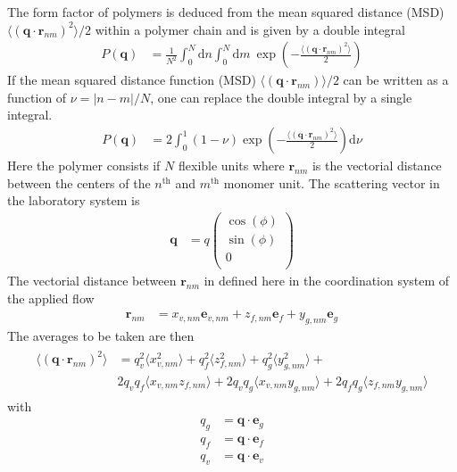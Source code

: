 The form factor of polymers is deduced from the mean squared distance (MSD) $\langle(\mathbf{q}\cdot\mathbf{r}_{nm})^2\rangle/2$ within a polymer chain and is given by a double integral
\begin{align}
  P(\mathbf{q}) & = \frac{1}{N^2}\int_0^N\mathrm{d}n\int_0^N\mathrm{d}m\: \exp\left(-\frac{\langle(\mathbf{q}\cdot\mathbf{r}_{nm})^2\rangle}{2}\right)
\end{align}
If the mean squared distance function (MSD) $\langle(\mathbf{q}\cdot\mathbf{r}_{nm})\rangle/2$ can be written as a function of $\nu=\left|n-m\right|/N$, one can replace the double integral by a single integral.
\begin{align} \label{eq:IQ_MSD}
 P(\mathbf{q}) & = 2\int_0^1 (1-\nu) \exp\left(-\frac{\langle(\mathbf{q}\cdot\mathbf{r}_{nm})^2\rangle}{2}\right) \mathrm{d}\nu
\end{align}
Here the polymer consists if $N$ flexible units where $\mathbf{r}_{nm}$ is the vectorial distance between the centers of the $n^\mathrm{th}$ and $m^\mathrm{th}$ monomer unit.
The scattering vector in the laboratory system is
\begin{align}
\mathbf{q} &= q
\left(
    \begin{array}{c}
        \cos(\phi) \\
        \sin(\phi) \\
        0 \\
    \end{array}
\right)
\end{align}
The vectorial distance between  $\mathbf{r}_{nm}$ in defined here in the coordination system of the applied flow
\begin{align}
\mathbf{r}_{nm} &= x_{v,nm} \mathbf{e}_{v,nm} + z_{f,nm} \mathbf{e}_{f} + y_{g,nm} \mathbf{e}_{g}
\end{align}
The averages to be taken are then
\begin{align}
\begin{split} \label{MSDfull}
 \langle(\mathbf{q}\cdot\mathbf{r}_{nm})^2\rangle  & = q_v^2 \langle x_{v,nm}^2\rangle + q_f^2 \langle z_{f,nm}^2\rangle + q_g^2 \langle y_{g,nm}^2\rangle + \\
 & 2q_v q_f \langle x_{v,nm} z_{f,nm}\rangle + 2q_v q_g \langle x_{v,nm} y_{g,nm}\rangle + 2q_fq_g \langle z_{f,nm}y_{g,nm}\rangle
 \end{split}
\end{align}
with
\begin{align}
  q_g &= \mathbf{q}\cdot \mathbf{e}_g \label{eq:eg} \\
  q_f &= \mathbf{q}\cdot \mathbf{e}_f \label{eq:ef} \\
  q_v &= \mathbf{q}\cdot \mathbf{e}_v \label{eq:ev}
\end{align}
